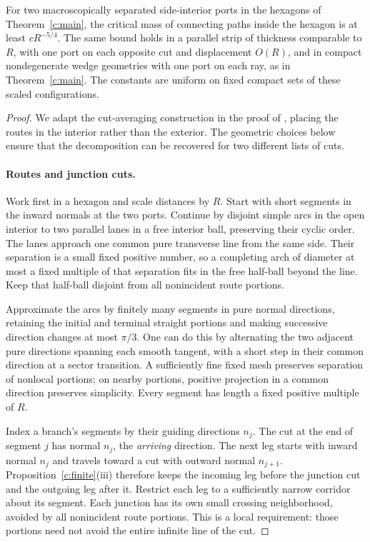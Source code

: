 \begin{proposition}\label{c:connectors}
For two macroscopically separated side-interior ports in the hexagons of
Theorem~\ref{c:main}, the critical mass of connecting paths inside the
hexagon is at least $cR^{-5/4}$. The same bound holds in a parallel strip
of thickness comparable to $R$, with one port on each opposite cut and
displacement $O(R)$, and in compact nondegenerate wedge geometries with
one port on each ray, as in Theorem~\ref{c:main}. The constants are uniform
on fixed compact sets of these scaled configurations.
\end{proposition}
\begin{proof}
We adapt the cut-averaging construction in the proof of
\cite[Proposition 10.2]{UniformMarked}, placing the routes in the interior
rather than the exterior. The geometric choices below ensure that the
decomposition can be recovered for two different lists of cuts.

\paragraph{Routes and junction cuts.}
Work first in a hexagon and scale distances by $R$. Start with short
segments in the inward normals at the two ports. Continue by disjoint
simple arcs in the open interior to two parallel lanes in a free interior
ball, preserving their cyclic order. The lanes approach one common pure
transverse line from the same side. Their separation is a small fixed
positive number, so a completing arch of diameter at most a fixed
multiple of that separation fits in the free half-ball beyond the line.
Keep that half-ball disjoint from all nonincident route portions.

Approximate the arcs by finitely many segments in pure normal directions,
retaining the initial and terminal straight portions and making successive
direction changes at most $\pi/3$. One can do this by alternating the two
adjacent pure directions spanning each smooth tangent, with a short step
in their common direction at a sector transition. A sufficiently fine
fixed mesh preserves separation of nonlocal portions; on nearby portions,
positive projection in a common direction preserves simplicity. Every
segment has length a fixed positive multiple of $R$.

Index a branch's segments by their guiding directions $n_j$. The cut at
the end of segment $j$ has normal $n_j$, the \emph{arriving} direction.
The next leg starts with inward normal $n_j$ and travels toward a cut
with outward normal $n_{j+1}$. Proposition~\ref{c:finite}(iii) therefore
keeps the incoming leg before the junction cut and the outgoing leg
after it. Restrict each leg to a sufficiently narrow corridor about its
segment. Each junction has its own small crossing neighborhood, avoided
by all nonincident route portions. This is a local requirement: those
portions need not avoid the entire infinite line of the cut.


\end{proof}
